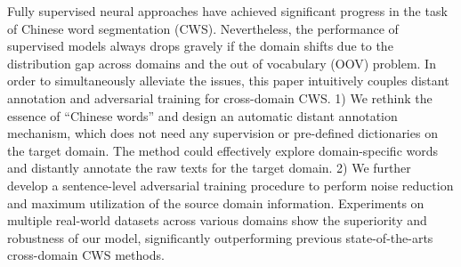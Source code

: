 Fully supervised neural approaches have achieved significant progress in the task of Chinese word segmentation (CWS). Nevertheless, the performance of supervised models always drops gravely if the domain shifts due to the distribution gap across domains and the out of vocabulary (OOV) problem. In order to simultaneously alleviate the issues, this paper intuitively couples distant annotation and adversarial training for cross-domain CWS. 1) We rethink the essence of ``Chinese words'' and design an automatic distant annotation mechanism, which does not need any supervision or pre-defined dictionaries on the target domain. The method could effectively explore domain-specific words and distantly annotate the raw texts for the target domain. 2) We further develop a sentence-level adversarial training procedure to perform noise reduction and maximum utilization of the source domain information. Experiments on multiple real-world datasets across various domains show the superiority and robustness of our model, significantly outperforming previous state-of-the-arts cross-domain CWS methods.
